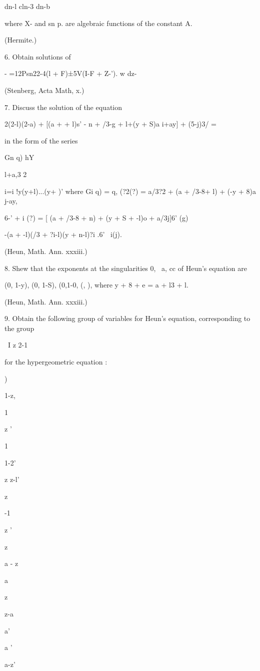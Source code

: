 {{{{{{{{dn-l cln-3 dn-b

where X- and sn p. are algebraic functions of the constant A.

(Hermite.)

6. Obtain solutions of

- =12Psn22-4(l + F)±5V(I-F + Z-'). w dz-

(Stenberg, Acta Math, x.)

7. Discuss the solution of the equation

2(2-l)(2-a) + [(a + + l)s' - n + /3-g + l+(y + S)a i+ay] + (5-j)3/ =

in the form of the series

Gn q) hY

l+a,3 2

i=i !y(y+l)...(y+ )' where Gi q) = q, (?2(?) = a/3?2 + (a + /3-8+ l) +
(-y + 8)a j-ay,

6-' + i (?) = [ (a + /3-8 + n) + (y + S + -l)o + a/3j]6' (g)

-(a + -l)(/3 + ?i-l)(y + n-l)?i .6' \ i(j).

(Heun, Math. Ann. xxxiii.)

%
%

8. Shew that the exponents at the singularities 0, \, a, cc of Heun's
equation are

(0, 1-y), (0, 1-S), (0,1-0, (, ), where y + 8 + e = a + l3 + l.

(Heun, Math. Ann. xxxiii.)

9. Obtain the following group of variables for Heun's equation,
corresponding to the group

\ I z 2-1

for the hypergeometric equation :

 )

1-z,

1

z '

1

1-2'

z z-l'

z

-1

z '

z

a - z

  

a

z

z-a

a'

a '

a-z'

}}}}}}}}
